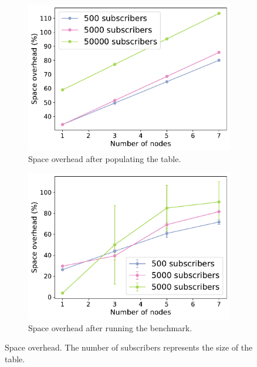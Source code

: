 \begin{figure}[htp]
  \centering
  \begin{subfigure}[t]{0.95\columnwidth}
    \centering
    \includegraphics[width=\columnwidth]{figures/space_overhead_populate.pdf}
    \caption{Space overhead after populating the table.}
    \label{fig:space overhead populate}
  \end{subfigure}
  
  \begin{subfigure}[t]{0.95\columnwidth}
    \centering
    \includegraphics[width=\columnwidth]{figures/space_overhead_runtime.pdf}
    \caption{Space overhead after running the benchmark.}
    \label{fig:space overhead runtime}
  \end{subfigure}
  \caption{Space overhead. The number of subscribers represents the size of the
  table.}

\end{figure}


